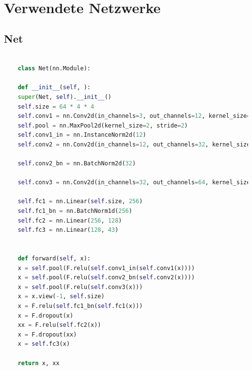 \documentclass[11pt,a4paper]{article}
\numberwithin{equation}{section}
\begin{document}
	\printglossaries
	\newpage
	\appendix
	\section{Verwendete Netzwerke}
	\subsection{Net}
	
	\begin{lstlisting}[language=Python, caption=Kleines Netzwerk]
	
	class Net(nn.Module):
	
	def __init__(self, ):
	super(Net, self).__init__()
	self.size = 64 * 4 * 4
	self.conv1 = nn.Conv2d(in_channels=3, out_channels=12, kernel_size=5, padding=2)
	self.pool = nn.MaxPool2d(kernel_size=2, stride=2)
	self.conv1_in = nn.InstanceNorm2d(12)
	self.conv2 = nn.Conv2d(in_channels=12, out_channels=32, kernel_size=5, padding=2)
	
	self.conv2_bn = nn.BatchNorm2d(32)
	
	self.conv3 = nn.Conv2d(in_channels=32, out_channels=64, kernel_size=5, padding=2)
	
	self.fc1 = nn.Linear(self.size, 256)
	self.fc1_bn = nn.BatchNorm1d(256)
	self.fc2 = nn.Linear(256, 128)
	self.fc3 = nn.Linear(128, 43)
	
	
	def forward(self, x):
	x = self.pool(F.relu(self.conv1_in(self.conv1(x))))
	x = self.pool(F.relu(self.conv2_bn(self.conv2(x))))
	x = self.pool(F.relu(self.conv3(x)))
	x = x.view(-1, self.size)
	x = F.relu(self.fc1_bn(self.fc1(x)))
	x = F.dropout(x)
	xx = F.relu(self.fc2(x))
	x = F.dropout(xx)
	x = self.fc3(x)
	
	return x, xx
	
	\end{lstlisting}
	
\end{document}
